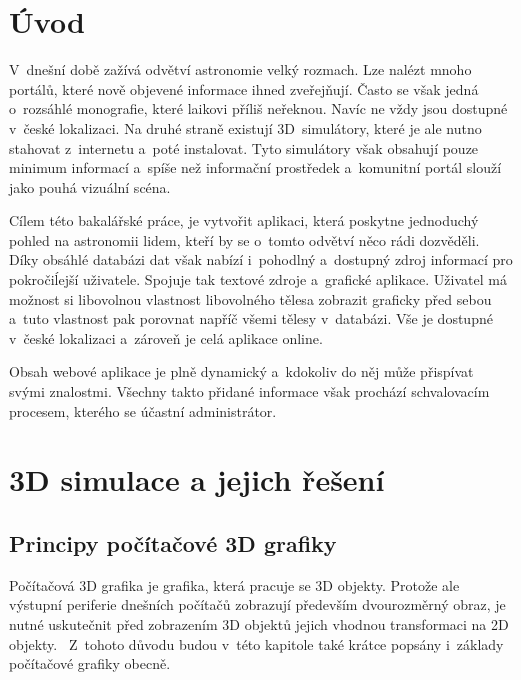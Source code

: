 \documentclass[a4paper,12pt]{article}
\begin{document}

\clearpage
\pagestyle{plain}		%

 {}
\section*{Úvod}
\label{uvod}

V~dnešní době zažívá odvětví astronomie velký rozmach. Lze nalézt mnoho portálů, které nově objevené informace ihned zveřejňují. Často se však jedná o~rozsáhlé monografie, které laikovi příliš neřeknou. Navíc ne vždy jsou dostupné v~české lokalizaci. Na druhé straně existují 3D~simulátory, které je ale nutno stahovat z~internetu a~poté instalovat. Tyto simulátory však obsahují pouze minimum informací a~spíše než informační prostředek a~komunitní portál slouží jako pouhá vizuální scéna.

Cílem této bakalářské práce, je vytvořit aplikaci, která poskytne jednoduchý pohled na astronomii lidem, kteří by se o~tomto odvětví něco rádi  dozvěděli. Díky obsáhlé databázi dat však nabízí i~pohodlný a~dostupný zdroj informací pro pokročiĺejší uživatele. Spojuje tak textové zdroje a~grafické aplikace. Uživatel má možnost 
si libovolnou vlastnost libovolného tělesa zobrazit graficky před sebou a~tuto vlastnost pak porovnat napříč všemi tělesy v~databázi. Vše je dostupné v~české lokalizaci a~zároveň je celá aplikace online.

Obsah webové aplikace je plně dynamický a~kdokoliv do něj může přispívat svými znalostmi. Všechny takto přidané informace však prochází schvalovacím procesem, kterého se účastní administrátor.



\section{3D simulace a jejich řešení}

\subsection{Principy počítačové 3D grafiky}

Počítačová 3D grafika je grafika, která pracuje se 3D objekty. Protože ale výstupní periferie dnešních počítačů zobrazují především dvourozměrný obraz, je nutné uskutečnit před zobrazením 3D objektů jejich vhodnou transformaci na 2D objekty.~\cite{graphic} Z~tohoto důvodu budou v~této kapitole také krátce popsány i~základy počítačové grafiky obecně.
\end{document}
